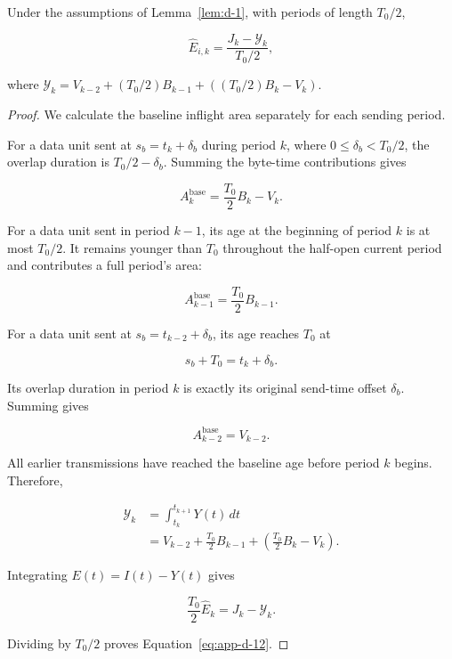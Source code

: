 \begin{lemma}
\label{lem:d-2}
Under the assumptions of Lemma~\ref{lem:d-1}, with periods of length \(T_0/2\),

\begin{equation}
\label{eq:app-d-12}
\boxed{\widehat E_{i,k}=\frac{J_k-\mathcal Y_k}{T_0/2},}
\end{equation}

where \(\mathcal Y_k=V_{k-2}+(T_0/2)B_{k-1}+((T_0/2)B_k-V_k)\).
\end{lemma}

\begin{proof} We calculate the baseline inflight area separately for each sending period.

For a data unit sent at \(s_b=t_k+\delta_b\) during period \(k\), where \(0\le\delta_b<T_0/2\), the overlap duration is \(T_0/2-\delta_b\). Summing the byte-time contributions gives

\begin{equation}
\label{eq:app-d-13}
A_k^{\mathrm{base}}=\frac{T_0}{2}B_k-V_k.
\end{equation}

For a data unit sent in period \(k-1\), its age at the beginning of period \(k\) is at most \(T_0/2\). It remains younger than \(T_0\) throughout the half-open current period and contributes a full period's area:

\begin{equation}
\label{eq:app-d-14}
A_{k-1}^{\mathrm{base}}=\frac{T_0}{2}B_{k-1}.
\end{equation}

For a data unit sent at \(s_b=t_{k-2}+\delta_b\), its age reaches \(T_0\) at

\[
s_b+T_0=t_k+\delta_b.
\]

Its overlap duration in period \(k\) is exactly its original send-time offset \(\delta_b\). Summing gives

\begin{equation}
\label{eq:app-d-15}
A_{k-2}^{\mathrm{base}}=V_{k-2}.
\end{equation}

All earlier transmissions have reached the baseline age before period \(k\) begins. Therefore,

\begin{equation}
\label{eq:app-d-16}
\begin{aligned}
\mathcal Y_k&=\int_{t_k}^{t_{k+1}}Y(t)\,dt\\
&=V_{k-2}+\frac{T_0}{2}B_{k-1}
  +\left(\frac{T_0}{2}B_k-V_k\right).
\end{aligned}
\end{equation}

Integrating \(E(t)=I(t)-Y(t)\) gives

\[
\frac{T_0}{2}\widehat E_k=J_k-\mathcal Y_k.
\]

Dividing by \(T_0/2\) proves Equation~\eqref{eq:app-d-12}.
\end{proof}

